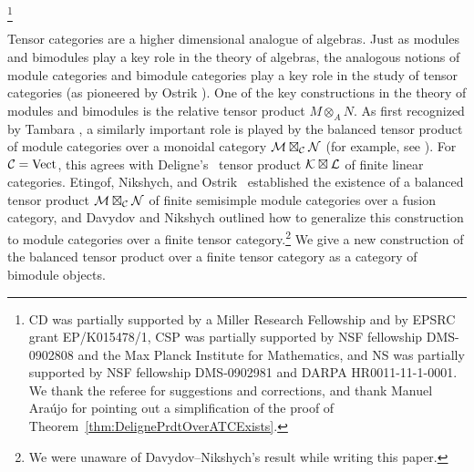 \documentclass{amsart}
\begin{document}
\thanks{CD was partially supported by a Miller Research Fellowship and by EPSRC grant EP/K015478/1, CSP was partially supported by NSF fellowship DMS-0902808 and the Max Planck Institute for Mathematics, and NS was partially supported by NSF fellowship DMS-0902981 and DARPA HR0011-11-1-0001.  We thank the referee for suggestions and corrections, and thank Manuel Ara\'ujo for pointing out a simplification of the proof of Theorem~\ref{thm:DelignePrdtOverATCExists}.
}


\maketitle	

\tikzexternaldisable


Tensor categories are a higher dimensional analogue of algebras.  Just as modules and bimodules play a key role in the theory of algebras, the analogous notions of module categories and bimodule categories play a key role in the study of tensor categories (as pioneered by Ostrik \cite{MR1976459}).  One of the key constructions in the theory of modules and bimodules is the relative tensor product $M \otimes_A N$.  As first recognized by Tambara \cite{tambara}, a similarly important role is played by the balanced tensor product of module categories over a monoidal category $\mathcal M \boxtimes_\mathcal C \mathcal N$ (for example, see \cite{MR1966524, 0909.3140, MR2511638, MR2909758, 1202.4396, MR3022755, MR3063919}).  For $\mathcal C = \mathrm{Vect}$, this agrees with Deligne's~\cite{MR1106898} tensor product $\mathcal K \boxtimes \mathcal L$ of finite linear categories. Etingof, Nikshych, and Ostrik~\cite{0909.3140} established the existence of a balanced tensor product $\mathcal M \boxtimes_{\mathcal C} \mathcal N$ of finite semisimple module categories over a fusion category, and Davydov and Nikshych \cite[\S 2.7]{MR3107567} outlined how to generalize this construction to module categories over a finite tensor category.\footnote{We were unaware of Davydov--Nikshych's result while writing this paper.}  We give a new construction of the balanced tensor product over a finite tensor category as a category of bimodule objects.
\end{document}
